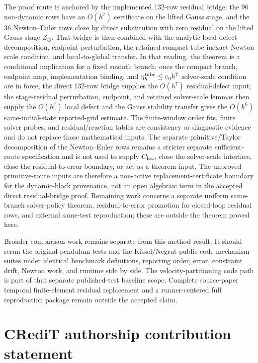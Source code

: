 \documentclass[preprint,12pt]{elsarticle}
\begin{document}
The proof route is anchored by the implemented 132-row residual bridge: the
96 non-dynamic rows have an \(O(h^7)\) certificate on the lifted Gauss stage,
and the 36 Newton--Euler rows close by direct substitution with zero
residual on the lifted Gauss stage \(Z_G\). That bridge is then combined with
the analytic local-defect decomposition, endpoint perturbation, the retained
compact-tube inexact-Newton scale condition, and local-to-global transfer. In
that reading, the theorem is a conditional implication for a fixed smooth
branch: once the compact branch, endpoint map, implementation binding, and
\(\eta_h^{\rm tube}\le c_\eta h^7\) solver-scale condition are in force, the
direct 132-row bridge supplies the \(O(h^7)\) residual-defect input; the
stage-residual perturbation, endpoint, and retained solver-scale lemmas then
supply the \(O(h^7)\) local defect and the Gauss
stability transfer gives the \(O(h^6)\) same-initial-state reported-grid
estimate. The finite-window order
fits, finite solver probes, and residual/reaction tables are consistency or
diagnostic evidence and do not replace those mathematical inputs. The separate
primitive/Taylor decomposition of the Newton--Euler rows remains a stricter
separate sufficient-route specification and is not used to supply \(C_{\rm loc}\), close the
solver-scale interface, close the residual-to-error boundary, or act as a
theorem input. The unproved primitive-route inputs are therefore a non-active
replacement-certificate boundary for the dynamic-block provenance, not an
open algebraic term in the accepted direct residual-bridge proof. Remaining
work concerns a separate
uniform same-branch solver-policy theorem, residual-to-error promotion for
closed-loop residual rows, and external same-test reproduction; these are
outside the theorem proved here.

Broader comparison work remains separate from this method result. It should
rerun the original pendulum tests and the Kissel/Negrut public-code mechanism
suites under identical benchmark definitions, reporting order, error,
constraint drift, Newton work, and runtime side by side. The
velocity-partitioning code path is part of that separate published-test baseline
scope. Complete source-paper temporal finite-element residual replacement and
a runner-centered full reproduction package remain outside the accepted claim.

\section*{CRediT authorship contribution statement}
\end{document}
